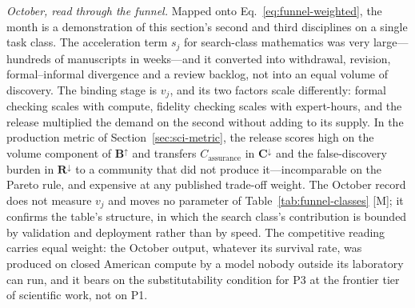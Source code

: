 \emph{October, read through the funnel.} Mapped onto Eq.~\eqref{eq:funnel-weighted}, the month is a demonstration of this section's second and third disciplines on a single task class. The acceleration term $s_j$ for search-class mathematics was very large---hundreds of manuscripts in weeks---and it converted into withdrawal, revision, formal--informal divergence and a review backlog, not into an equal volume of discovery. The binding stage is $v_j$, and its two factors scale differently: formal checking scales with compute, fidelity checking scales with expert-hours, and the release multiplied the demand on the second without adding to its supply. In the production metric of Section~\ref{sec:sci-metric}, the release scores high on the volume component of $\mathbf{B}^{\uparrow}$ and transfers $C_{\mathrm{assurance}}$ in $\mathbf{C}^{\downarrow}$ and the false-discovery burden in $\mathbf{R}^{\downarrow}$ to a community that did not produce it---incomparable on the Pareto rule, and expensive at any published trade-off weight. The October record does not measure $v_j$ and moves no parameter of Table~\ref{tab:funnel-classes} [M]; it confirms the table's structure, in which the search class's contribution is bounded by validation and deployment rather than by speed. The competitive reading carries equal weight: the October output, whatever its survival rate, was produced on closed American compute by a model nobody outside its laboratory can run, and it bears on the substitutability condition for P3 at the frontier tier of scientific work, not on P1.

